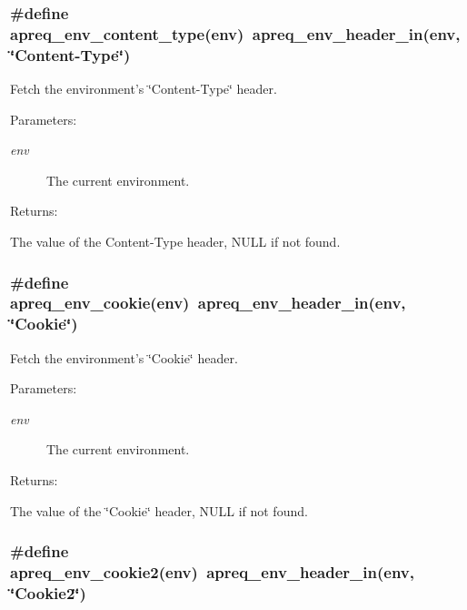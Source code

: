 \subsubsection{\setlength{\rightskip}{0pt plus 5cm}\#define apreq\_\-env\_\-content\_\-type(env)\ apreq\_\-env\_\-header\_\-in(env, \char`\"{}Content-Type\char`\"{})}\label{group__ENV_a13}


Fetch the environment's \char`\"{}Content-Type\char`\"{} header. \begin{Desc}
\item[Parameters: ]\par
\begin{description}
\item[{\em 
env}]The current environment. \end{description}
\end{Desc}
\begin{Desc}
\item[Returns: ]\par
The value of the Content-Type header, NULL if not found. \end{Desc}
\subsubsection{\setlength{\rightskip}{0pt plus 5cm}\#define apreq\_\-env\_\-cookie(env)\ apreq\_\-env\_\-header\_\-in(env, \char`\"{}Cookie\char`\"{})}\label{group__ENV_a14}


Fetch the environment's \char`\"{}Cookie\char`\"{} header. \begin{Desc}
\item[Parameters: ]\par
\begin{description}
\item[{\em 
env}]The current environment. \end{description}
\end{Desc}
\begin{Desc}
\item[Returns: ]\par
The value of the \char`\"{}Cookie\char`\"{} header, NULL if not found. \end{Desc}
\subsubsection{\setlength{\rightskip}{0pt plus 5cm}\#define apreq\_\-env\_\-cookie2(env)\ apreq\_\-env\_\-header\_\-in(env, \char`\"{}Cookie2\char`\"{})}\label{group__ENV_a15}



